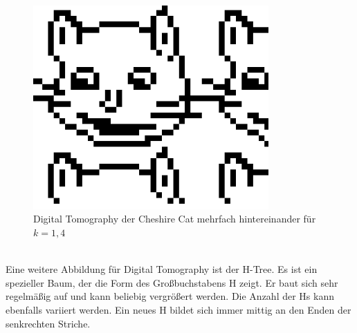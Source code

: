 \documentclass[a4,abstract=on]{scrartcl}
\begin{document}
\begin{figure}[H]
\centering
\includegraphics[width=9cm]{cats.png}
\caption{Digital Tomography der Cheshire Cat mehrfach hintereinander für $k=1,4$}
\label{fig:cats}
\end{figure}
\ \\
Eine weitere Abbildung für Digital Tomography ist der H-Tree. Es ist ein spezieller Baum, der die Form des Großbuchstabens H zeigt. Er baut sich sehr regelmäßig auf und kann beliebig vergrößert werden. Die Anzahl der Hs kann ebenfalls variiert werden. Ein neues H bildet sich immer mittig an den Enden der senkrechten Striche.
\end{document}
